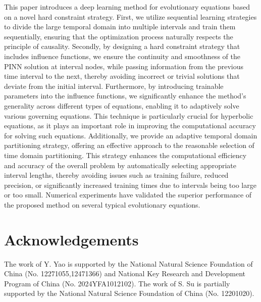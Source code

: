 \documentclass[preprint]{elsarticle}
\numberwithin{table}{section}
\numberwithin{equation}{section}
\numberwithin{figure}{section}
\begin{document}
\begin{CJK}{UTF8}{gbsn}
This paper introduces a deep learning method for evolutionary equations based on a novel hard constraint strategy. First, we utilize sequential learning strategies to divide the large temporal domain  into multiple intervals and train them sequentially, ensuring that the optimization process naturally  respects the principle of causality. Secondly, by designing a hard constraint strategy that includes influence functions, we ensure the continuity and smoothness of the PINN solution at interval nodes, while passing information from the previous time interval to the next, thereby avoiding incorrect or trivial solutions that deviate from the initial  interval. Furthermore, by introducing trainable parameters into the influence functions, we significantly enhance the method's generality across different types of equations, enabling it to adaptively solve various governing equations. 
This technique is particularly crucial for hyperbolic equations, as it plays an important role in improving the computational accuracy for solving such equations.
Additionally, we provide an adaptive temporal domain partitioning strategy, offering an effective approach to the reasonable selection of time domain partitioning. This strategy enhances the computational efficiency and accuracy of the overall problem by automatically selecting appropriate interval lengths, thereby avoiding issues such as training failure, reduced precision, or significantly increased training times due to intervals being too large or too small. Numerical experiments have validated the superior performance of the proposed method on several typical evolutionary equations.












\section*{Acknowledgements}
The work of Y. Yao is supported by the National Natural Science Foundation of China (No. 12271055,12471366) and National Key Research and Development Program of China (No. 2024YFA1012102). The work of S. Su is partially supported by the National Natural Science Foundation of China (No. 12201020). 


%



\end{CJK}
\end{document}
